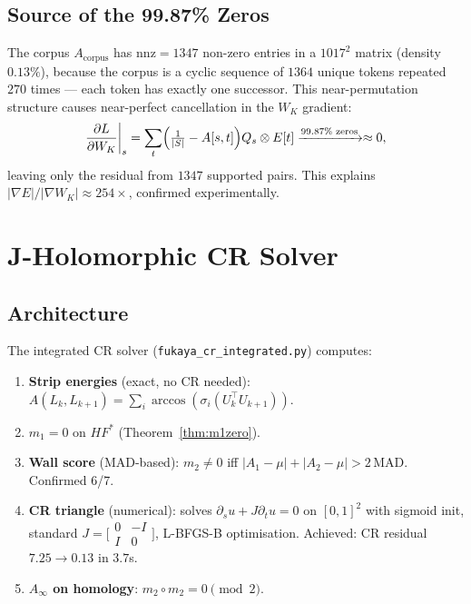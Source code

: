 \documentclass[11pt]{amsart}
\begin{document}
\subsection{Source of the 99.87\% Zeros}

The corpus $A_\mathrm{corpus}$ has $\mathrm{nnz}=1347$ non-zero entries
in a $1017^2$ matrix (density $0.13\%$), because the corpus is a
cyclic sequence of $1364$ unique tokens repeated $270$ times
--- each token has exactly one successor.
This near-permutation structure causes near-perfect cancellation in
the $W_K$ gradient:
\[
  \frac{\partial L}{\partial W_K}\bigg|_s
  = \sum_t \Bigl(\tfrac{1}{|S|} - A[s,t]\Bigr) Q_s \otimes E[t]
  \xrightarrow{99.87\%\text{ zeros}} \approx 0,
\]
leaving only the residual from $1347$ supported pairs.
This explains $|\nabla E|/|\nabla W_K| \approx 254\times$,
confirmed experimentally.

\section{J-Holomorphic CR Solver}
\label{sec:cr}

\subsection{Architecture}

The integrated CR solver (\texttt{fukaya\_cr\_integrated.py}) computes:
\begin{enumerate}
\item \textbf{Strip energies} (exact, no CR needed):
  $A(L_k,L_{k+1}) = \sum_i \arccos(\sigma_i(U_k^\top U_{k+1}))$.
\item \textbf{$m_1 = 0$} on $HF^{*}$ (Theorem~\ref{thm:m1zero}).
\item \textbf{Wall score} (MAD-based): $m_2\neq 0$ iff
  $|A_1-\mu|+|A_2-\mu|>2\,\mathrm{MAD}$. Confirmed 6/7.
\item \textbf{CR triangle} (numerical): solves
  $\partial_s u + J\partial_t u=0$ on $[0,1]^2$ with sigmoid init,
  standard $J=\bigl[\begin{smallmatrix}0&-I\\I&0\end{smallmatrix}\bigr]$,
  L-BFGS-B optimisation.
  Achieved: CR residual $7.25\to 0.13$ in $3.7$s.
\item \textbf{$A_\infty$ on homology}: $m_2\circ m_2=0\pmod{2}$.
\end{enumerate}
\end{document}

